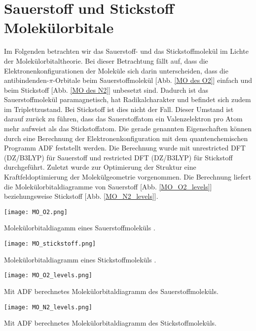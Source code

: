 \section{Sauerstoff und Stickstoff Molekülorbitale}

Im Folgenden betrachten wir das Sauerstoff- und das Stickstoffmolekül im Lichte der Molekülorbitaltheorie. Bei dieser Betrachtung fällt auf, dass die Elektronenkonfigurationen der Moleküle sich darin unterscheiden, dass die antibindenden-$ \pi $-Orbitale beim Sauerstoffmolekül [Abb. \ref{MO des O2}] einfach und beim Stickstoff [Abb. \ref{MO des N2}] unbesetzt sind. Dadurch ist das Sauerstoffmolekül paramagnetisch, hat Radikalcharakter und befindet sich zudem im Triplettzustand. Bei Stickstoff ist dies nicht der Fall. Dieser Umstand ist darauf zurück zu führen, dass das Sauerstoffatom ein Valenzelektron pro Atom mehr aufweist als das Stickstoffatom. Die gerade genannten Eigenschaften können durch eine Berechnung der Elektronenkonfiguration mit dem quantenchemischen Programm ADF \cite{ADF2017authors} feststellt werden. Die Berechnung wurde mit unrestricted DFT (DZ/B3LYP) für Sauerstoff und restricted DFT (DZ/B3LYP) für Stickstoff durchgeführt. Zuletzt wurde zur Optimierung der Struktur eine Kraftfeldoptimierung der Molekülgeometrie vorgenommen. Die Berechnung liefert die Molekülorbitaldiagramme von Sauerstoff [Abb. \ref{MO_O2_levels}] beziehungsweise Stickstoff [Abb. \ref{MO_N2_levels}].

\begin{dsafigure}
	\centering
	\texttt{[image: MO\_O2.png]}
	\caption{Molekülorbitaldiagamm eines Sauerstoffmoleküls \cite{MOO2}.}
	\label{MO des O2}
\end{dsafigure}

\begin{dsafigure}
	\centering
	\texttt{[image: MO\_stickstoff.png]}
	\caption{Molekülorbitaldiagramm eines Stickstoffmoleküls \cite{MON2}.}
	\label{MO des N2}
\end{dsafigure}

\begin{dsafigure}
	\centering
	\texttt{[image: MO\_O2\_levels.png]}
	\caption{Mit ADF berechnetes Molekülorbitaldiagramm des Sauerstoffmoleküls.}
	\label{MO_O2_levels}
\end{dsafigure}

\begin{dsafigure}
	\centering
	\texttt{[image: MO\_N2\_levels.png]}
	\caption{Mit ADF berechnetes Molekülorbitaldiagramm des Stickstoffmoleküls.}
	\label{MO_N2_levels}
\end{dsafigure}
